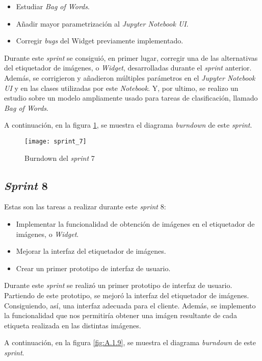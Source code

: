 \begin{itemize}
	\item Estudiar \textit{Bag of Words}.
	\item Añadir mayor parametrización al \textit{Jupyter Notebook UI}.
	\item Corregir \textit{bugs} del Widget previamente implementado.
\end{itemize}

Durante este \textit{sprint} se consiguió, en primer lugar, corregir una de las alternativas del etiquetador de imágenes, o \textit{Widget}, desarrolladas durante el \textit{sprint} anterior. Además, se corrigieron y añadieron múltiples parámetros en el \textit{Jupyter Notebook UI} y en las clases utilizadas por este \textit{Notebook}. Y, por ultimo, se realizo un estudio sobre un modelo ampliamente usado para tareas de clasificación, llamado \textit{Bag of Words}.

A continuación, en la figura \ref{fig:A.1.8}, se muestra el diagrama \textit{burndown} de este \textit{sprint}.

\begin{figure}
\centering
\texttt{[image: sprint\_7]}
\caption{Burndown del \textit{sprint} 7}
\label{fig:A.1.8}
\end{figure}


\subsection{\textit{Sprint} 8}
Estas son las tareas a realizar durante este \textit{sprint} 8:

\begin{itemize}
	\item Implementar la funcionalidad de obtención de imágenes en el etiquetador de imágenes, o \textit{Widget}.
	\item Mejorar la interfaz del etiquetador de imágenes.
	\item Crear un primer prototipo de interfaz de usuario.
\end{itemize}

Durante este \textit{sprint} se realizó un primer prototipo de interfaz de  usuario. Partiendo de este prototipo, se mejoró la interfaz del etiquetador de imágenes. Consiguiendo, así, una interfaz adecuada para el cliente. Además, se implemento la funcionalidad que nos permitiría obtener una imágen resultante de cada etiqueta realizada en las distintas imágenes.

A continuación, en la figura \ref{fig:A.1.9}, se muestra el diagrama \textit{burndown} de este \textit{sprint}.

